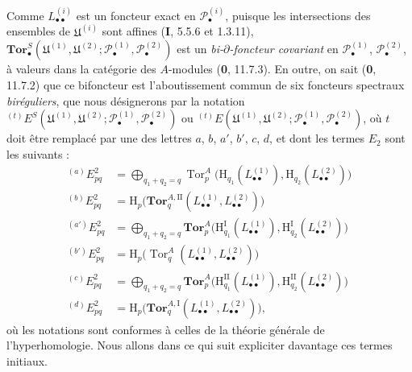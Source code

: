 \begin{env}[6.6.2]
Comme $L_{\bullet\bullet}^{(i)}$ est un foncteur exact en
$\mathscr P_\bullet^{(i)}$, puisque les intersections des ensembles
de $\mathfrak U^{(i)}$ sont affines (\textbf{I}, 5.5.6 et 1.3.11),
$\mathbf{Tor}_\bullet^S
(\mathfrak U^{(1)},\mathfrak U^{(2)};
 \mathscr P_\bullet^{(1)},\mathscr P_\bullet^{(2)})$ est un
\emph{bi-$\partial$-foncteur covariant} en $\mathscr P_\bullet^{(1)}$,
$\mathscr P_\bullet^{(2)}$, à valeurs dans la catégorie des $A$-modules
(\textbf{0}, 11.7.3). En outre, on sait (\textbf{0}, 11.7.2) que ce
bifoncteur est l'aboutissement commun de six foncteurs spectraux \emph{biréguliers},
que nous désignerons par la notation
${}^{(t)}E^S
(\mathfrak U^{(1)},\mathfrak U^{(2)};
\mathscr P_\bullet^{(1)},\mathscr P_\bullet^{(2)})$
ou
${}^{(t)}E
(\mathfrak U^{(1)},\mathfrak U^{(2)};
\mathscr P_\bullet^{(1)},\mathscr P_\bullet^{(2)})$,
où $t$ doit être remplacé par une des lettres $a$, $b$, $a'$, $b'$, $c$,
$d$, et dont les termes $E_2$ sont les suivants :
\[
\begin{aligned}
  {}^{(a)}E_{pq}^2
  &=\bigoplus_{q_1+q_2=q}
    \operatorname{Tor}_p^A
    \bigl(\mathrm H_{q_1}(L_{\bullet\bullet}^{(1)}),
          \mathrm H_{q_2}(L_{\bullet\bullet}^{(2)})\bigr)\\
  {}^{(b)}E_{pq}^2
  &=\mathrm H_p\bigl(
    \mathbf{Tor}_q^{A,\mathrm{II}}
    (L_{\bullet\bullet}^{(1)},L_{\bullet\bullet}^{(2)})\bigr)\\
  {}^{(a')}E_{pq}^2
  &=\bigoplus_{q_1+q_2=q}
    \mathbf{Tor}_p^A
    \bigl(\mathrm H_{q_1}^{\mathrm I}(L_{\bullet\bullet}^{(1)}),
          \mathrm H_{q_2}^{\mathrm I}(L_{\bullet\bullet}^{(2)})\bigr)\\
  {}^{(b')}E_{pq}^2
  &=\mathrm H_p\bigl(
    \operatorname{Tor}_q^A
    (L_{\bullet\bullet}^{(1)},L_{\bullet\bullet}^{(2)})\bigr)\\
  {}^{(c)}E_{pq}^2
  &=\bigoplus_{q_1+q_2=q}
    \mathbf{Tor}_p^A
    \bigl(\mathrm H_{q_1}^{\mathrm{II}}(L_{\bullet\bullet}^{(1)}),
          \mathrm H_{q_2}^{\mathrm{II}}(L_{\bullet\bullet}^{(2)})\bigr)\\
  {}^{(d)}E_{pq}^2
  &=\mathrm H_p\bigl(
    \mathbf{Tor}_q^{A,\mathrm I}
    (L_{\bullet\bullet}^{(1)},L_{\bullet\bullet}^{(2)})\bigr),
\end{aligned}
\]
où les notations sont conformes à celles de la théorie générale de
l'hyperhomologie. Nous allons dans ce qui suit expliciter davantage ces
termes initiaux.
\end{env}

